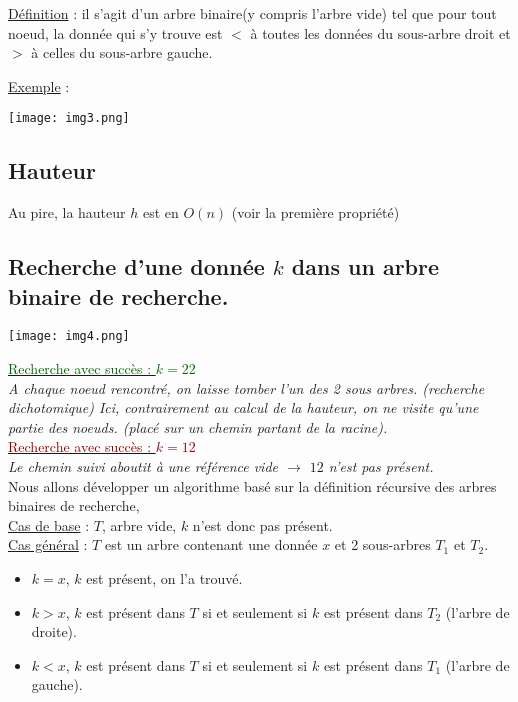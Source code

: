 \documentclass{article}
\newcommand{\ab}{\textbf{arbre binaire }}
\begin{document}
\underline{Définition} : il s'agit d'un arbre binaire(y compris l'arbre vide) tel que pour tout noeud, la donnée qui 
\indent s'y trouve est $<$ à toutes les données du sous-arbre droit et $>$ à celles du sous-arbre gauche.

\underline{Exemple} : 

\texttt{[image: img3.png]}

\subsection{Hauteur} Au pire, la hauteur $h$ est en $O(n)$ (voir la première propriété)

\subsection{Recherche d'une donnée $k$ dans un \ab de recherche.}

\texttt{[image: img4.png]}

\underline{\textcolor{darkgreen}{Recherche avec succès : $k=22$}} \\
\textit{A chaque noeud rencontré, on laisse tomber l'un des 2 sous arbres. (recherche dichotomique) Ici, contrairement
au calcul de la hauteur, on ne visite qu'une partie des noeuds. (placé sur un chemin partant de la racine).}\\
\indent\underline{\textcolor{darkred}{Recherche avec succès : $k=12$}} \\
\textit{Le chemin suivi aboutit à une référence vide $\rightarrow$ $12$ n'est pas présent.} \\
 
Nous allons développer un algorithme basé sur la définition récursive des arbres binaires de recherche, \\
\underline{Cas de base} : $T$, arbre vide, $k$ n'est donc pas présent. \\
\underline{Cas général} : $T$ est un arbre contenant une donnée $x$ et 2 sous-arbres $T_1$ et $T_2$.\\
\begin{itemize}
 \item $k=x$, $k$ est présent, on l'a trouvé.
 \item $k>x$, $k$ est présent dans $T$ si et seulement si $k$ est présent dans $T_2$ (l'arbre de droite).
 \item $k<x$, $k$ est présent dans $T$ si et seulement si $k$ est présent dans $T_1$ (l'arbre de gauche).
\end{itemize}
\end{document}
